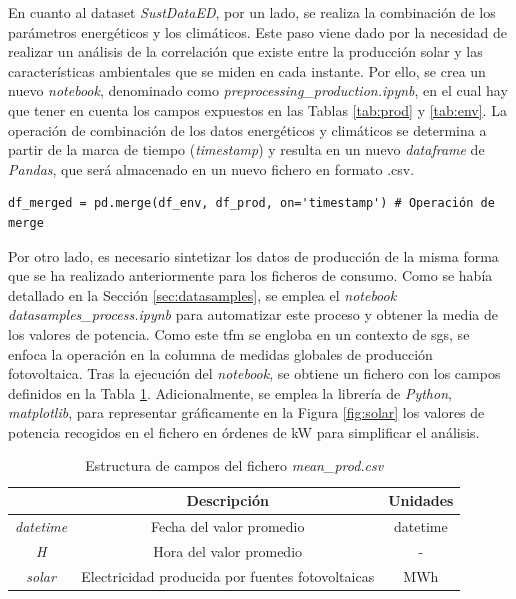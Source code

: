 En cuanto al dataset \textit{SustDataED}, por un lado, se realiza la combinación de los parámetros energéticos y los climáticos. Este paso viene dado por la necesidad de realizar un análisis de la correlación que existe entre la producción solar y las características ambientales que se miden en cada instante. Por ello, se crea un nuevo \textit{notebook}, denominado como \textit{preprocessing\_production.ipynb}, en el cual hay que tener en cuenta los campos expuestos en las Tablas \ref{tab:prod} y \ref{tab:env}. La operación de combinación de los datos energéticos y climáticos se determina a partir de la marca de tiempo (\textit{timestamp}) y resulta en un nuevo \textit{dataframe} de \textit{Pandas}, que será almacenado en un nuevo fichero en formato .csv.

\vspace{3mm}

\begin{lstlisting}[style=Python, caption={Combinación de datos de clima y de producción}]
  df_merged = pd.merge(df_env, df_prod, on='timestamp') # Operación de merge
\end{lstlisting}

\vspace{3mm}

Por otro lado, es necesario sintetizar los datos de producción de la misma forma que se ha realizado anteriormente para los ficheros de consumo. Como se había detallado en la Sección \ref{sec:datasamples}, se emplea el \textit{notebook} \textit{datasamples\_process.ipynb} para automatizar este proceso y obtener la media de los valores de potencia. Como este \gls{tfm} se engloba en un contexto de \gls{sg}s, se enfoca la operación en la columna de medidas globales de producción fotovoltaica. Tras la ejecución del \textit{notebook}, se obtiene un fichero con los campos definidos en la Tabla \ref{tab:prodsamples}. Adicionalmente, se emplea la librería de \textit{Python}, \textit{matplotlib}, para representar gráficamente en la Figura \ref{fig:solar} los valores de potencia recogidos en el fichero en órdenes de kW para simplificar el análisis.

\vspace{3mm}

\begin{table}[h!]
  \centering
  \begin{tabular}{|c|c|c|}
  \hline
  \rowcolor[HTML]{AAAAAA} 
  \multicolumn{1}{|c|}{\cellcolor[HTML]{AAAAAA}Campo} & \multicolumn{1}{c|}{\cellcolor[HTML]{AAAAAA}Descripción} & Unidades \\ \hline
  \textit{datetime} & Fecha del valor promedio & datetime \\ \hline
  \textit{H} & Hora del valor promedio & - \\ \hline
  \textit{solar} & Electricidad producida por fuentes fotovoltaicas & MWh \\ \hline
  \end{tabular}
  \caption{Estructura de campos del fichero \textit{mean\_prod.csv}}
  \label{tab:prodsamples}
\end{table}

